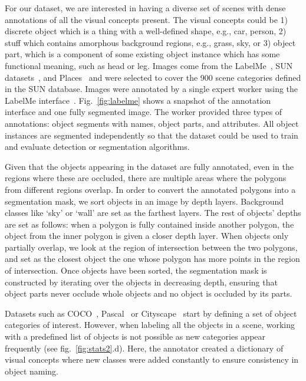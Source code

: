 For our dataset, we are interested in having a diverse set of scenes with dense annotations of all the visual concepts present. The visual concepts could be 1) discrete object which is a thing with a well-defined shape, e.g., car, person, 2) stuff which contains amorphous background regions, e.g., grass, sky, or 3) object part, which is a component of some existing object instance which has some functional meaning, such as head or leg. Images come from the LabelMe~\citep{russell2008labelme}, SUN datasets~\citep{xiao2010sun}, and Places~\citep{zhou2014learning} and were selected to cover the 900 scene categories defined in the SUN database. Images were annotated by a single expert worker using the LabelMe interface~\citep{russell2008labelme}.  Fig.~\ref{fig:labelme} shows a snapshot of the annotation interface and one fully segmented image. The worker provided three types of annotations: object segments with names, object parts, and attributes. All object instances are segmented independently so that the dataset could be used to train and evaluate detection or segmentation algorithms.

Given that the objects appearing in the dataset are fully annotated, even in the regions where these are occluded, there are multiple areas where the polygons from different regions overlap. In order to convert the annotated polygons into a segmentation mask, we sort objects in an image by depth layers. Background classes like `sky' or `wall' are set as the farthest layers. The rest of objects' depths are set as follows: when a polygon is fully contained inside another polygon, the object from the inner polygon is given a closer depth layer. When objects only partially overlap, we look at the region of intersection between the two polygons, and set as the closest object the one whose polygon has more points in the region of intersection. Once objects have been sorted, the segmentation mask is constructed by iterating over the objects in decreasing depth, ensuring that object parts never occlude whole objects and no object is occluded by its parts.    

Datasets such as COCO~\citep{lin2014microsoft}, Pascal~\citep{everingham2010pascal} or Cityscape~\citep{Cordts2015Cvprw} start by defining a set of object categories of interest. However, when labeling all the objects in a scene, working with a predefined list of objects is not possible as new categories appear frequently (see fig.~\ref{fig:stats2}.d). Here, the annotator created a dictionary of visual concepts where new classes were added constantly to ensure consistency in object naming. 

